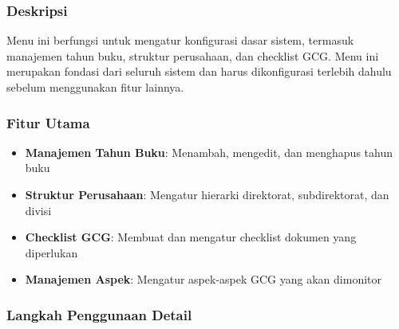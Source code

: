 \documentclass[12pt,a4paper]{article}
\begin{document}
\subsubsection{Deskripsi}
Menu ini berfungsi untuk mengatur konfigurasi dasar sistem, termasuk manajemen tahun buku, struktur perusahaan, dan checklist GCG. Menu ini merupakan fondasi dari seluruh sistem dan harus dikonfigurasi terlebih dahulu sebelum menggunakan fitur lainnya.

\subsubsection{Fitur Utama}
\begin{itemize}
\item \textbf{Manajemen Tahun Buku}: Menambah, mengedit, dan menghapus tahun buku
\item \textbf{Struktur Perusahaan}: Mengatur hierarki direktorat, subdirektorat, dan divisi
\item \textbf{Checklist GCG}: Membuat dan mengatur checklist dokumen yang diperlukan
\item \textbf{Manajemen Aspek}: Mengatur aspek-aspek GCG yang akan dimonitor
\end{itemize}

\subsubsection{Langkah Penggunaan Detail}
\end{document}
